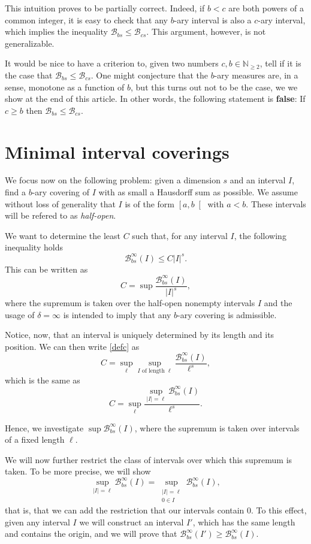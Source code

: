 \documentclass[11pt, reqno]{amsart}
\newcommand{\N}{\mathbb{N}}
\newcommand{\BB}{\mathcal{B}}
\begin{document}
This intuition proves to be partially correct. Indeed, if $b < c$ are both powers of a common integer, it is easy to check that any $b$-ary interval is also a $c$-ary interval, which implies the inequality $\BB_{bs} \leq \BB_{cs}$. This argument, however, is not generalizable.

It would be nice to have a criterion to, given two numbers $c, b \in \N_{\geq 2}$, tell if it is the case that $\BB_{bs} \leq \BB_{cs}$. One might conjecture that the $b$-ary measures are, in a sense, monotone as a function of $b$, but this turns out not to be the case, we we show at the end of this article. In other words, the following statement is \textbf{false}: If $c \geq b$ then $\BB_{bs} \leq \BB_{cs}$.\label{falseconjecture}

\section{Minimal interval coverings}\label{sec5}

We focus now on the following problem: given a dimension $s$ and an interval $I$, find a $b$-ary covering of $I$ with as small a Hausdorff sum as possible. We assume without loss of generality that $I$ is of the form $\left[ a, b \right[$ with $a < b$. These intervals will be refered to as \emph{half-open}.

We want to determine the least  $C$ such that, for any interval $I$, the following inequality holds
$$\BB_{bs}^\infty(I) \leq C \lvert I \rvert^s.$$
 This can be written as
\begin{equation}\label{defc}
C = \sup \frac{\BB_{bs}^\infty(I)}{\lvert I \rvert^s},
\end{equation}
where the supremum is taken over the half-open nonempty intervals $I$ and the usage of $\delta = \infty$ is intended to imply that any $b$-ary covering is admissible.

Notice, now, that an interval is uniquely determined by its length and its position. We can then write \eqref{defc} as
\[C = \sup_\ell \sup_\text{$I$ of length $\ell$} \frac{\BB_{bs}^\infty(I)}{\ell^s},\]
which is the same as
\[C = \sup_\ell \frac{\sup_{\lvert I \rvert = \ell} \BB_{bs}^\infty(I)}{\ell^s}.\]

Hence, we investigate $\sup \BB_{bs}^\infty(I)$, where the supremum is taken over intervals of a fixed length $\ell$.

We will now further restrict the class of intervals over which this supremum is taken. To be more precise, we will show
\[\sup_{\lvert I \rvert = \ell} \BB_{bs}^\infty(I) = \sup_{\substack{\lvert I \rvert = \ell\\ 0 \in I}} \BB_{bs}^\infty(I),\]
that is, that we can add the restriction that our intervals contain 0. To this effect, given any interval $I$ we will construct an interval $I'$, which has the same length and contains the origin, and we will prove that $\BB_{bs}^\infty(I') \geq \BB_{bs}^\infty(I)$.
\end{document}
